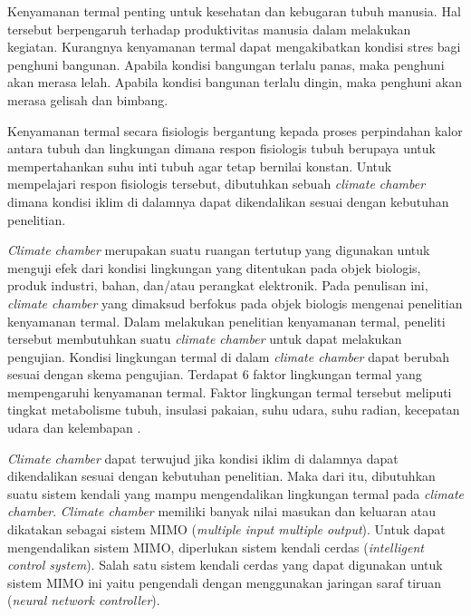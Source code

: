 Kenyamanan termal penting untuk kesehatan dan kebugaran tubuh manusia. Hal tersebut berpengaruh terhadap produktivitas manusia dalam melakukan kegiatan. Kurangnya kenyamanan termal dapat mengakibatkan kondisi stres bagi penghuni bangunan. Apabila kondisi bangungan terlalu panas, maka penghuni akan merasa lelah. Apabila kondisi bangunan terlalu dingin, maka penghuni akan merasa gelisah dan bimbang.

Kenyamanan termal secara fisiologis bergantung kepada proses perpindahan kalor antara tubuh dan lingkungan dimana respon fisiologis tubuh berupaya untuk mempertahankan suhu inti tubuh agar tetap bernilai konstan. Untuk mempelajari respon fisiologis tersebut, dibutuhkan sebuah \textit{climate chamber} dimana kondisi iklim di dalamnya dapat dikendalikan sesuai dengan kebutuhan penelitian.

\textit{Climate chamber} merupakan suatu ruangan tertutup yang digunakan untuk menguji efek dari kondisi lingkungan yang ditentukan pada objek biologis, produk industri, bahan, dan/atau perangkat elektronik. Pada penulisan ini, \textit{climate chamber} yang dimaksud berfokus pada objek biologis mengenai penelitian kenyamanan termal. Dalam melakukan penelitian kenyamanan termal, peneliti tersebut membutuhkan suatu \textit{climate chamber} untuk dapat melakukan pengujian. Kondisi lingkungan termal di dalam \textit{climate chamber} dapat berubah sesuai dengan skema pengujian. Terdapat 6 faktor lingkungan termal yang mempengaruhi kenyamanan termal. Faktor lingkungan termal tersebut meliputi tingkat metabolisme tubuh, insulasi pakaian, suhu udara, suhu radian, kecepatan udara dan kelembapan \cite{ASHRAE55}.

\textit{Climate chamber} dapat terwujud jika kondisi iklim di dalamnya dapat dikendalikan sesuai dengan kebutuhan penelitian. Maka dari itu, dibutuhkan suatu sistem kendali yang mampu mengendalikan lingkungan termal pada \textit{climate chamber}. \textit{Climate chamber} memiliki banyak nilai masukan dan keluaran atau dikatakan sebagai sistem MIMO (\textit{multiple input multiple output}). Untuk dapat mengendalikan sistem MIMO, diperlukan sistem kendali cerdas (\textit{intelligent control system}). Salah satu sistem kendali cerdas yang dapat digunakan untuk sistem MIMO ini yaitu pengendali dengan menggunakan jaringan saraf tiruan (\textit{neural network controller}).

